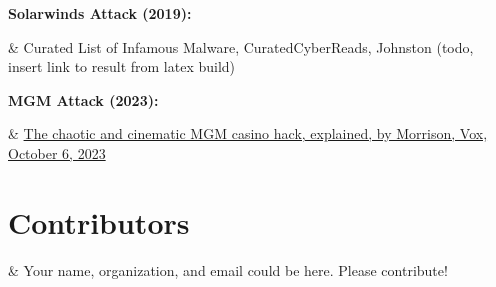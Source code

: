 \documentclass[a4paper]{article}
\begin{document}
	\noindent\textbf{Solarwinds Attack (2019):}
	\begin{easylist}[itemize]
	& Curated List of Infamous Malware, CuratedCyberReads, Johnston (todo, insert link to result from latex build)
	\end{easylist}

	\noindent\textbf{MGM Attack (2023):}
 	\begin{easylist}[itemize]
 	& \href{https://www.vox.com/technology/2023/9/15/23875113/mgm-hack-casino-vishing-cybersecurity-ransomware}{The chaotic and cinematic MGM casino hack, explained, by Morrison, Vox, October 6, 2023}
 	\end{easylist}
  
	\section*{Contributors}
 	\begin{easylist}[itemize]
  	& Your name, organization, and email could be here.  Please contribute!
	\end{easylist}
\end{document}

